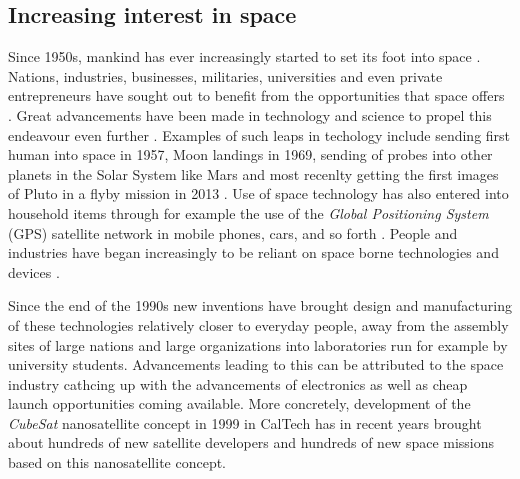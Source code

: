 \documentclass[english,12pt,a4paper,pdftex,elec,utf8]{aaltothesis}
\begin{document}
\subsection{Increasing interest in space}
Since 1950s, mankind has ever increasingly started to set its foot into space \cite{aftersputnik}. Nations, industries, businesses, militaries, universities and even private entrepreneurs have sought out to benefit from the opportunities that space offers \cite{aftersputnik, rocketeers, Swart1}. Great advancements have been made in technology and science to propel this endeavour even further \cite{aftersputnik}. Examples of such leaps in techology include sending first human into space in 1957, Moon landings in 1969, sending of probes into other planets in the Solar System like Mars and most recenlty getting the first images of Pluto in a flyby mission in 2013 \cite{aftersputnik, pluto}. Use of space technology has also entered into household items through for example the use of the \textit{Global Positioning System} (GPS) satellite network in mobile phones, cars, and so forth \cite{satcommunications}. People and industries have began increasingly to be reliant on space borne technologies and devices \cite{satcommunications}.\par
Since the end of the 1990s new inventions have brought design and manufacturing of these technologies relatively closer to everyday people, away from the assembly sites of large nations and large organizations into laboratories run for example by university students. Advancements leading to this can be attributed to the space industry cathcing up with the advancements of electronics as well as cheap launch opportunities coming available. More concretely, development of the \textit{CubeSat} nanosatellite concept in 1999 in CalTech has in recent years brought about hundreds of new satellite developers and hundreds of new space missions based on this nanosatellite concept. \cite{Swart1, Swart2016}\par 
\end{document}
